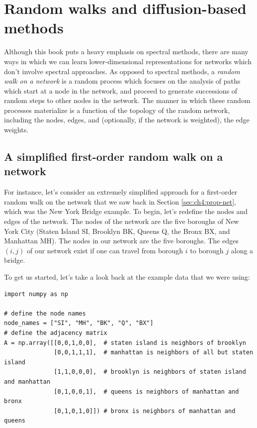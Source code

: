 \section{Random walks and diffusion-based methods}
\label{sec:ch10:diffusion}

Although this book puts a heavy emphasis on spectral methods, there are many ways in which we can learn lower-dimensional representations for networks which don't involve spectral approaches. As opposed to spectral methods, a \textit{random walk on a network} is a random process which focuses on the analysis of paths which start at a node in the network, and proceed to generate successions of random steps to other nodes in the network. The manner in which these random processes materialize is a function of the topology of the random network, including the nodes, edges, and (optionally, if the network is weighted), the edge weights. 
\subsection{A simplified first-order random walk on a network}

For instance, let's consider an extremely simplified approach for a first-order random walk on the network that we saw back in Section \ref{sec:ch4:prop-net}, which was the New York Bridge example. To begin, let's redefine the nodes and edges of the network. The nodes of the network are the five boroughs of New York City (Staten Island SI, Brooklyn BK, Queens Q, the Bronx BX, and Manhattan MH). The nodes in our network are the five boroughs. The edges $(i,j)$ of our network exist if one can travel from borough $i$ to borough $j$ along a bridge.

To get us started, let's take a look back at the example data that we were using:

\begin{lstlisting}[style=python]
import numpy as np

# define the node names
node_names = ["SI", "MH", "BK", "Q", "BX"]
# define the adjacency matrix
A = np.array([[0,0,1,0,0],  # staten island is neighbors of brooklyn
              [0,0,1,1,1],  # manhattan is neighbors of all but staten island
              [1,1,0,0,0],  # brooklyn is neighbors of staten island and manhattan
              [0,1,0,0,1],  # queens is neighbors of manhattan and bronx
              [0,1,0,1,0]]) # bronx is neighbors of manhattan and queens
\end{lstlisting}

